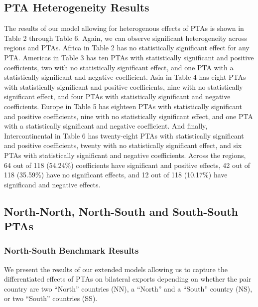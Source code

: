 \documentclass[12pt]{article}%
\begin{document}
\subsection{PTA Heterogeneity Results}%
\label{subsec:PTAHeterogeneityResults}%
The results of our model allowing for heterogenous effects of PTAs is
shown in Table 2 through Table 6. Again, we can observe significant
heterogeneity across regions and PTAs. Africa in Table 2 has no
statistically significant effect for any PTA. Americas in Table 3 has
ten PTAs with statistically significant and positive coefficients, two
with no statistically significant effect, and one PTA with a
statistically significant and negative coefficient. Asia in Table 4 has
eight PTAs with statistically significant and positive coefficients,
nine with no statistically significant effect, and four PTAs with
statistically significant and negative coefficients. Europe in Table 5
has eighteen PTAs with statistically significant and positive
coefficients, nine with no statistically significant effect, and one PTA
with a statistically significant and negative coefficient. And finally,
Intercontinental in Table 6 has twenty-eight PTAs with statistically
significant and positive coefficients, twenty with no statistically
significant effect, and six PTAs with statistically significant and
negative coefficients. Across the regions, 64 out of 118 (54.24\%)
coefficients have significant and positive effects, 42 out of 118
(35.59\%) have no significant effects, and 12 out of 118 (10.17\%) have
significand and negative effects.
%
%
%
%
%
%
\FloatBarrier

%
\subsection{North{-}North, North{-}South and South{-}South PTAs}%
\label{subsec:North{-}North,North{-}SouthandSouth{-}SouthPTAs}%
\subsubsection{North{-}South Benchmark Results}%
\label{ssubsec:North{-}SouthBenchmarkResults}%
We present the results of our extended models allowing us to capture the
differentiated effects of PTAs on bilateral exports depending on whether
the pair country are two ``North'' countries (NN), a ``North'' and a
``South'' country (NS), or two ``South'' countries (SS).
\end{document}

